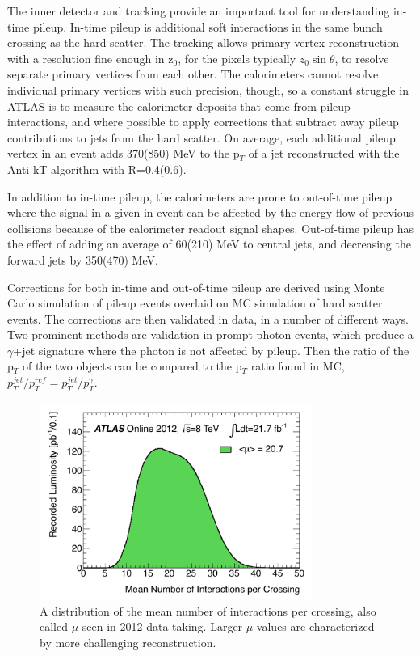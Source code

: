 The inner detector and tracking provide an important tool for understanding in-time pileup.  In-time pileup is additional soft interactions in the same bunch crossing as the hard scatter.  The tracking allows primary vertex reconstruction with a resolution fine enough in z$_0$, for the pixels typically $z_0\sin\theta$, to resolve separate primary vertices from each other.   The calorimeters cannot resolve individual primary vertices with such precision, though, so a constant struggle in ATLAS is to measure the calorimeter deposits that come from pileup interactions, and where possible to apply corrections that subtract away pileup contributions to jets from the hard scatter.  On average, each additional pileup vertex in an event adds 370(850) MeV to the p$_T$ of a jet reconstructed with the Anti-kT algorithm with R=0.4(0.6).

In addition to in-time pileup, the calorimeters are prone to out-of-time pileup where the signal in a given in event can be affected by the energy flow of previous collisions because of the calorimeter readout signal shapes.  Out-of-time pileup has the effect of adding an average of 60(210) MeV to central jets, and decreasing the forward jets by 350(470) MeV.  

Corrections for both in-time and out-of-time pileup are derived using Monte Carlo simulation of pileup events overlaid on MC simulation of hard scatter events.  The corrections are then validated in data, in a number of different ways.  Two prominent methods are validation in prompt photon events, which produce a $\gamma$+jet signature where the photon is not affected by pileup.  Then the ratio of the p$_T$ of the two objects can be compared to the p$_T$ ratio found in MC, $p^{jet}_T/p^{ref}_T = p^{jet}_T/p^{\gamma}_T$.


\begin{figure}
	\includegraphics[width=0.8\textwidth]{ReconstructionPerformance/images/mu_2012-dec.pdf}
	\caption{A distribution of the mean number of interactions per crossing, also called $\mu$ seen in 2012 data-taking.  Larger $\mu$ values are characterized by more challenging reconstruction. 	\label{fig:mu_2012}  }
\end{figure}


